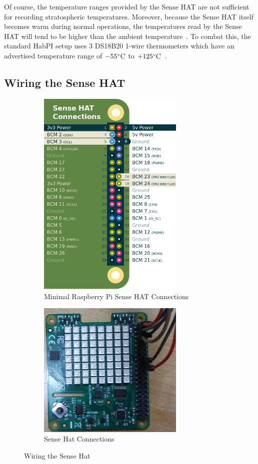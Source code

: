\documentclass[journal]{new-aiaa}
\begin{document}
Of course, the temperature ranges provided by the Sense HAT are not
sufficient for recording stratospheric temperatures.  Moreover,
because the Sense HAT itself becomes warm during normal operations, the
temperatures read by the Sense HAT will tend to be higher than the
ambient temperature~\cite{SenseHat-API}.  To combat this, the standard
HabPI setup uses 3 DS18B20 1-wire thermometers which have an
advertised temperature range of $-55\celsius$ to
$+125\celsius$~\cite{DS18B20}.

\subsection{Wiring the Sense HAT}
\begin{figure}
    \centering
    \begin{subfigure}{.45\textwidth}
        \centering
        \includegraphics[width=2.75in]{images/rpi-sensehat}
        \caption{Minimal Raspberry Pi Sense HAT
        Connections~\cite{pinout}}
        \label{fig:pinout}
    \end{subfigure}
    \begin{subfigure}{.45\textwidth}
        \centering
        \includegraphics[width=2.75in]{images/sensehat}
        \caption{Sense Hat Connections}
        \label{fig:hat}
    \end{subfigure}
    \caption{Wiring the Sense Hat}
    \label{fig:hatwiring}
\end{figure}
\end{document}
